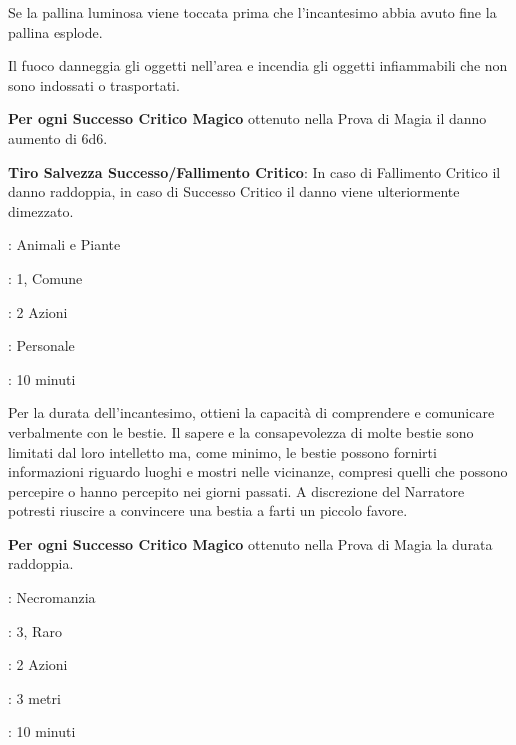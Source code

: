 \begin{multicols}{2}
Se la pallina luminosa viene toccata prima che l'incantesimo abbia avuto fine la pallina esplode.

Il fuoco danneggia gli oggetti nell'area e incendia gli oggetti infiammabili che non sono indossati o trasportati.

\textbf{Per ogni Successo Critico Magico} ottenuto nella Prova di Magia il danno aumento di 6d6.

\textbf{Tiro Salvezza Successo/Fallimento Critico}: In caso di Fallimento Critico il danno raddoppia, in caso di Successo Critico il danno viene ulteriormente dimezzato.

\noindent\colorbox{OBSSgold!10}{
\begin{minipage}{0.95\linewidth}
\begin{description}[noitemsep, topsep=0pt, parsep=0pt, partopsep=0pt, leftmargin=0cm, labelwidth=1.3cm]
	\item[\textbf{Lista}]: Animali e Piante
	\item[\textbf{Livello}]: 1, Comune
	\item[\textbf{Lancio}]: 2 Azioni
	\item[\textbf{Gittata}]: Personale
	\item[\textbf{Durata}]: 10 minuti
\end{description}
\end{minipage}}\smallskip

Per la durata dell'incantesimo, ottieni la capacità di comprendere e comunicare verbalmente con le bestie. Il sapere e la consapevolezza di molte bestie sono limitati dal loro intelletto ma, come minimo, le bestie possono fornirti informazioni riguardo luoghi e mostri nelle vicinanze, compresi quelli che possono percepire o hanno percepito nei giorni passati. A discrezione del Narratore potresti riuscire a convincere una bestia a farti un piccolo favore.

\textbf{Per ogni Successo Critico Magico} ottenuto nella Prova di Magia la durata raddoppia.

\noindent\colorbox{OBSSgold!10}{
\begin{minipage}{0.95\linewidth}
\begin{description}[noitemsep, topsep=0pt, parsep=0pt, partopsep=0pt, leftmargin=0cm, labelwidth=1.3cm]
	\item[\textbf{Lista}]: Necromanzia
	\item[\textbf{Livello}]: 3, Raro
	\item[\textbf{Lancio}]: 2 Azioni
	\item[\textbf{Gittata}]: 3 metri
	\item[\textbf{Durata}]: 10 minuti
\end{description}
\end{minipage}}\smallskip


\end{multicols}
